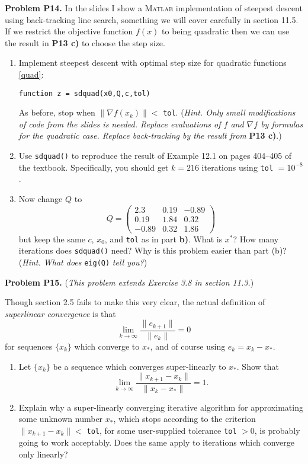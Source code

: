 \documentclass[12pt]{amsart}
\newcommand{\grad}{\nabla}
\newcommand{\Matlab}{\textsc{Matlab}\xspace}
\newcommand{\prob}[1]{\bigskip\noindent\textbf{#1}\quad }
\begin{document}
\medskip
\prob{Problem P14.}  In the slides I show a \Matlab implementation of steepest descent using back-tracking line search, something we will cover carefully in section 11.5.  If we restrict the objective function $f(x)$ to being quadratic then we can use the result in \textbf{P13 c)} to choose the step size.
\begin{enumerate}
\item Implement steepest descent with optimal step size for quadratic functions \eqref{quad}:

\centerline{\texttt{function z = sdquad(x0,Q,c,tol)}}

\noindent As before, stop when $\|\grad f(x_k)\| < $ \texttt{tol}.  (\emph{Hint.  Only small modifications of code from the slides is needed.  Replace evaluations of $f$ and $\grad f$ by formulas for the quadratic case.  Replace back-tracking by the result from }\textbf{P13 c)}.)
\item Use \texttt{sdquad()} to reproduce the result of Example 12.1 on pages 404--405 of the textbook.  Specifically, you should get $k=216$ iterations using \texttt{tol} $=10^{-8}$.
\item Now change $Q$ to
    $$Q = \begin{pmatrix}
    2.3   &  0.19 & -0.89 \\
    0.19  &  1.84 &  0.32 \\
    -0.89 &  0.32 &  1.86
    \end{pmatrix}$$
but keep the same $c$, $x_0$, and \texttt{tol} as in part \textbf{b)}.  What is $x^*$?  How many iterations does \texttt{sdquad()} need?  Why is this problem easier than part (b)?  (\emph{Hint.  What does} \texttt{eig(Q)} \emph{tell you?})
\end{enumerate}

\medskip
\prob{Problem P15.}  (\emph{This problem extends Exercise 3.8 in section 11.3.})

Though section 2.5 fails to make this very clear, the actual definition of \emph{superlinear convergence} is that
    $$\lim_{k\to\infty} \frac{\|e_{k+1}\|}{\|e_k\|} = 0$$
for sequences $\{x_k\}$ which converge to $x_*$, and of course using $e_k = x_k - x_*$.

\begin{enumerate}
\item Let $\{x_k\}$ be a sequence which converges super-linearly to $x_*$.  Show that
    $$\lim_{k\to\infty} \frac{\|x_{k+1} - x_k\|}{\|x_k - x_*\|} = 1.$$
\item Explain why a super-linearly converging iterative algorithm for approximating some unknown number $x_*$, which stops according to the criterion $\|x_{k+1} - x_k\| < $ \texttt{tol}, for some user-supplied tolerance \texttt{tol} $ > 0$, is probably going to work acceptably.  Does the same apply to iterations which converge only linearly? 
\end{enumerate}
\end{document}
